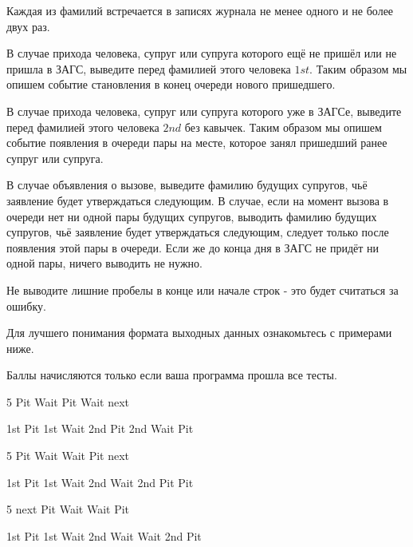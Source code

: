 Каждая из фамилий встречается в записях журнала не менее одного и не более двух раз.

\outputfmtSection

В случае прихода человека, супруг или супруга которого ещё не пришёл или не пришла в ЗАГС, выведите перед фамилией этого человека $1st$. Таким образом мы опишем событие становления в конец очереди нового пришедшего.

В случае прихода человека, супруг или супруга которого уже в ЗАГСе, выведите перед фамилией этого человека $2nd$ без кавычек. Таким образом мы опишем событие появления в очереди пары на месте, которое занял пришедший ранее супруг или супруга.

В случае объявления о вызове, выведите фамилию будущих супругов, чьё заявление будет утверждаться следующим. В случае, если на момент вызова в очереди нет ни одной пары будущих супругов, выводить фамилию будущих супругов, чьё заявление будет утверждаться следующим, следует только после появления этой пары в очереди. Если же до конца дня в ЗАГС не придёт ни одной пары, ничего выводить не нужно.

Не выводите лишние пробелы в конце или начале строк - это будет считаться за ошибку.

Для лучшего понимания формата выходных данных ознакомьтесь с примерами ниже.

\markSection

Баллы начисляются только если ваша программа прошла все тесты.


\begin{myverbbox}[\small]{\vinput}
    5
    Pit
    Wait
    Pit
    Wait
    next
\end{myverbbox}
\begin{myverbbox}[\small]{\voutput}
    1st Pit
    1st Wait
    2nd Pit
    2nd Wait
    Pit
\end{myverbbox}


\begin{myverbbox}[\small]{\vinput}
    5
    Pit
    Wait
    Wait
    Pit
    next
\end{myverbbox}
\begin{myverbbox}[\small]{\voutput}
    1st Pit
    1st Wait
    2nd Wait
    2nd Pit
    Pit
\end{myverbbox}


\begin{myverbbox}[\small]{\vinput}
    5
    next
    Pit
    Wait
    Wait
    Pit
\end{myverbbox}
\begin{myverbbox}[\small]{\voutput}
    1st Pit
    1st Wait
    2nd Wait
    Wait
    2nd Pit
\end{myverbbox}

